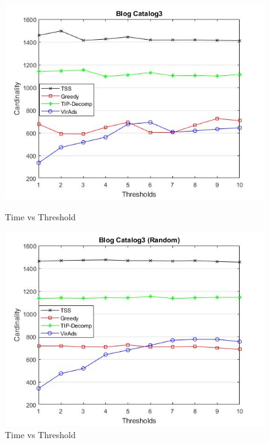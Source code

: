 \begin{figure}[h!]
\begin{minipage}[t]{0.50\textwidth}
\includegraphics[width=\linewidth,keepaspectratio=true]{images/bc3time.jpg}
\caption{Time vs Threshold}

\end{minipage}
\begin{minipage}[t]{0.50\textwidth}
\includegraphics[width=\linewidth,keepaspectratio=true]{images/bc3timerandom.jpg}
\caption{Time vs Threshold}
\end{minipage}
\end{figure}
